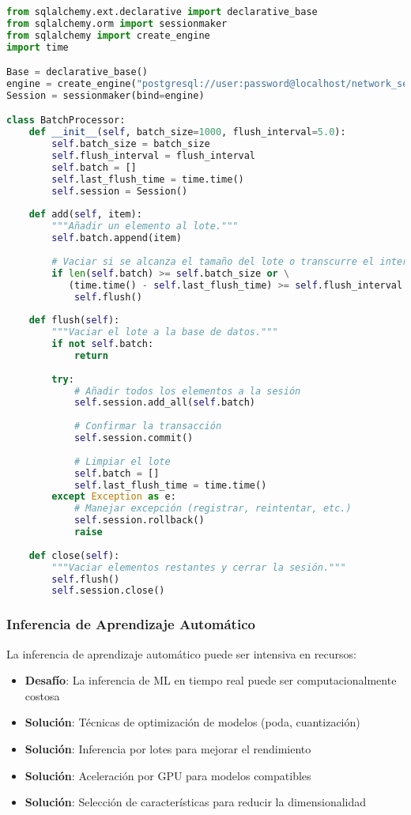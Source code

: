 \begin{lstlisting}[language=python, caption=Operaciones de Base de Datos por Lotes]
from sqlalchemy.ext.declarative import declarative_base
from sqlalchemy.orm import sessionmaker
from sqlalchemy import create_engine
import time

Base = declarative_base()
engine = create_engine("postgresql://user:password@localhost/network_security")
Session = sessionmaker(bind=engine)

class BatchProcessor:
    def __init__(self, batch_size=1000, flush_interval=5.0):
        self.batch_size = batch_size
        self.flush_interval = flush_interval
        self.batch = []
        self.last_flush_time = time.time()
        self.session = Session()
        
    def add(self, item):
        """Añadir un elemento al lote."""
        self.batch.append(item)
        
        # Vaciar si se alcanza el tamaño del lote o transcurre el intervalo
        if len(self.batch) >= self.batch_size or \
           (time.time() - self.last_flush_time) >= self.flush_interval:
            self.flush()
            
    def flush(self):
        """Vaciar el lote a la base de datos."""
        if not self.batch:
            return
            
        try:
            # Añadir todos los elementos a la sesión
            self.session.add_all(self.batch)
            
            # Confirmar la transacción
            self.session.commit()
            
            # Limpiar el lote
            self.batch = []
            self.last_flush_time = time.time()
        except Exception as e:
            # Manejar excepción (registrar, reintentar, etc.)
            self.session.rollback()
            raise
            
    def close(self):
        """Vaciar elementos restantes y cerrar la sesión."""
        self.flush()
        self.session.close()
\end{lstlisting}

\subsubsection{Inferencia de Aprendizaje Automático}
La inferencia de aprendizaje automático puede ser intensiva en recursos:

\begin{itemize}
    \item \textbf{Desafío}: La inferencia de ML en tiempo real puede ser computacionalmente costosa
    \item \textbf{Solución}: Técnicas de optimización de modelos (poda, cuantización)
    \item \textbf{Solución}: Inferencia por lotes para mejorar el rendimiento
    \item \textbf{Solución}: Aceleración por GPU para modelos compatibles
    \item \textbf{Solución}: Selección de características para reducir la dimensionalidad
\end{itemize}

